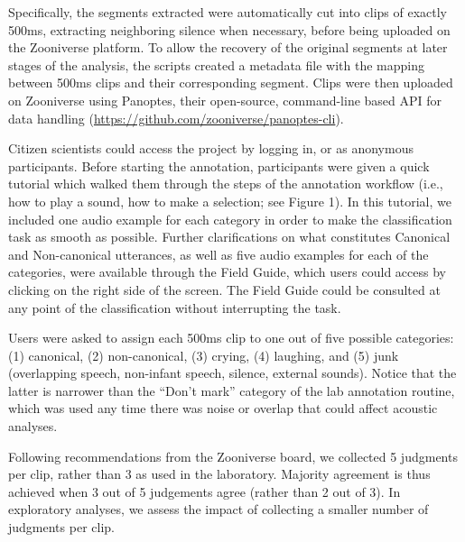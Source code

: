 \documentclass[english,,man,floatsintext]{apa6}
\begin{document}
Specifically, the segments extracted were automatically cut into clips of exactly 500ms, extracting neighboring silence when necessary, before being uploaded on the Zooniverse platform. To allow the recovery of the original segments at later stages of the analysis, the scripts created a metadata file with the mapping between 500ms clips and their corresponding segment. Clips were then uploaded on Zooniverse using Panoptes, their open-source, command-line based API for data handling (\url{https://github.com/zooniverse/panoptes-cli}).

Citizen scientists could access the project by logging in, or as anonymous participants. Before starting the annotation, participants were given a quick tutorial which walked them through the steps of the annotation workflow (i.e., how to play a sound, how to make a selection; see Figure 1). In this tutorial, we included one audio example for each category in order to make the classification task as smooth as possible. Further clarifications on what constitutes Canonical and Non-canonical utterances, as well as five audio examples for each of the categories, were available through the Field Guide, which users could access by clicking on the right side of the screen. The Field Guide could be consulted at any point of the classification without interrupting the task.

Users were asked to assign each 500ms clip to one out of five possible categories: (1) canonical, (2) non-canonical, (3) crying, (4) laughing, and (5) junk (overlapping speech, non-infant speech, silence, external sounds). Notice that the latter is narrower than the \enquote{Don't mark} category of the lab annotation routine, which was used any time there was noise or overlap that could affect acoustic analyses.

Following recommendations from the Zooniverse board, we collected 5 judgments per clip, rather than 3 as used in the laboratory. Majority agreement is thus achieved when 3 out of 5 judgements agree (rather than 2 out of 3). In exploratory analyses, we assess the impact of collecting a smaller number of judgments per clip.
\end{document}
